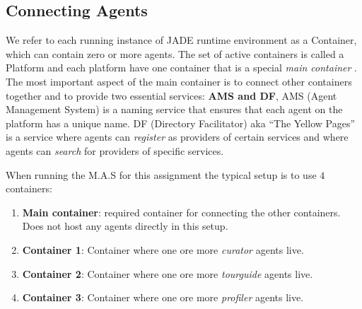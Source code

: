 \documentclass[a4paper, 11pt]{article}
\begin{document}
\subsection*{Connecting Agents}
We refer to each running instance of JADE runtime environment as a Container, which can contain zero or more agents. The set of active containers is called a Platform and each platform have one container that is a special \textit{main container} \citep{jade_tutorial}. The most important aspect of the main container is to connect other containers together and to provide two essential services: \textbf{AMS and DF}, AMS (Agent Management System) is a naming service that ensures that each agent on the platform has a unique name. DF (Directory Facilitator) aka ``The Yellow Pages'' is a service where agents can \textit{register} as providers of certain services and where agents can \textit{search} for providers of specific services. 

When running the M.A.S for this assignment the typical setup is to use $4$ containers:
\begin{enumerate}[I]
\item \textbf{Main container}: required container for connecting the other containers. Does not host any agents directly in this setup.
\item \textbf{Container 1}: Container where one ore more \textit{curator} agents live.
\item \textbf{Container 2}: Container where one ore more \textit{tourguide} agents live.
\item \textbf{Container 3}: Container where one ore more \textit{profiler} agents live.
\end{enumerate}
\end{document}
